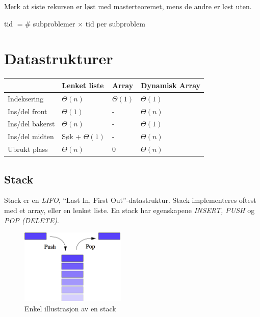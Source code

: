 \documentclass[a4paper, norsk,  10pt]{article}
\begin{document}
{{\noindent Merk at siste rekursen er løst med masterteoremet, mens de andre er løst uten. 

\begin{center}
tid $= \#$ subproblemer $\times$ tid per subproblem
\end{center}

\section{Datastrukturer}

\begin{center}
\begin{tabular}{|l|l|l|l|}
    \hline
                                & Lenket liste       & Array    & Dynamisk Array \\ \hline
    Indeksering             & $\Theta(n)$          & $\Theta(1)$ & $\Theta(1)$      \\ \hline
    Ins/del front & $\Theta(1)$          & -        & $\Theta(n)$      \\ \hline
    Ins/del bakerst       & $\Theta(n)$          & -        & $\Theta(1)$      \\ \hline
    Ins/del midten    & Søk + $\Theta(1)$ & -        & $\Theta(n)$      \\ \hline
    Ubrukt plass         & $\Theta(n)$          & $0$        & $\Theta(n)$      \\ \hline
\end{tabular}
\end{center}

\subsection{Stack}

Stack er en \textit{LIFO}, ``Last In, First Out''-datastruktur. Stack implementeres oftest med et array, eller en lenket liste. En stack har egenskapene \textit{INSERT, PUSH} og \textit{POP (DELETE)}. 

\begin{figure}[hbt]
    \begin{center}
        \includegraphics[width=5cm] {stack.png}
        \caption{Enkel illustrasjon av en stack}
    \end{center}
\end{figure}

}}
\end{document}
